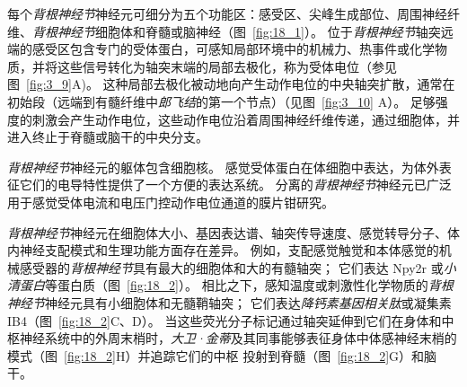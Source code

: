 每个\textit{背根神经节}神经元可细分为五个功能区：感受区、尖峰生成部位、周围神经纤维、\textit{背根神经节}细胞体和脊髓或脑神经（图~\ref{fig:18_1}）。
位于\textit{背根神经节}轴突远端的感受区包含专门的受体蛋白，可感知局部环境中的机械力、热事件或化学物质，并将这些信号转化为轴突末端的局部去极化，称为受体电位（参见图~\ref{fig:3_9}A)。
这种局部去极化被动地向产生动作电位的中央轴突扩散，通常在初始段（远端到有髓纤维中\textit{郎飞结}的第一个节点）（见图~\ref{fig:3_10} A）。
足够强度的刺激会产生动作电位，这些动作电位沿着周围神经纤维传递，通过细胞体，并进入终止于脊髓或脑干的中央分支。


\textit{背根神经节}神经元的躯体包含细胞核。 
感觉受体蛋白在体细胞中表达，为体外表征它们的电导特性提供了一个方便的表达系统。 
分离的\textit{背根神经节}神经元已广泛用于感觉受体电流和电压门控动作电位通道的膜片钳研究。


\textit{背根神经节}神经元在细胞体大小、基因表达谱、轴突传导速度、感觉转导分子、体内神经支配模式和生理功能方面存在差异。 
例如，支配感觉触觉和本体感觉的机械感受器的\textit{背根神经节}具有最大的细胞体和大的有髓轴突； 它们表达 Npy2r 或\textit{小清蛋白}等蛋白质（图~\ref{fig:18_2}）。
相比之下，感知温度或刺激性化学物质的\textit{背根神经节}神经元具有小细胞体和无髓鞘轴突； 它们表达\textit{降钙素基因相关肽}或凝集素 IB4（图~\ref{fig:18_2}C、D）。 
当这些荧光分子标记通过轴突延伸到它们在身体和中枢神经系统中的外周末梢时，\textit{大卫·金蒂}及其同事能够表征身体中体感神经末梢的模式（图~\ref{fig:18_2}H）并追踪它们的中枢 投射到脊髓（图~\ref{fig:18_2}G）和脑干。

